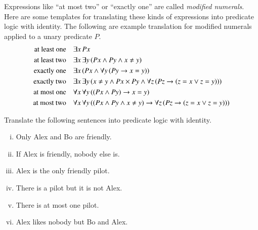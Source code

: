 \documentclass[nobib,nofonts]{tufte-handout}
\begin{document}
Expressions like ``at most two'' or ``exactly one'' are called \emph{modified numerals}.
Here are some templates for translating these kinds of expressions into predicate logic with identity.
The following are example translation for modified numerals applied to a unary predicate $P$.
\begin{align*}
  \text{at least one} &&& \exists x \thinspace Px \\
  \text{at least two} &&& \exists x \thinspace  \exists y \thinspace (Px \wedge Py \wedge x \neq y) \\
  \text{exactly one}  &&& \exists x \thinspace (Px \wedge \forall y \thinspace (Py \rightarrow x = y) )\\
  \text{exactly two}  &&& \exists x \thinspace \exists y \thinspace (x \neq y \wedge Px \times Py \wedge \forall z \thinspace (Pz \rightarrow (z = x \vee z = y))) \\
  \text{at most one}  &&& \forall x \thinspace \forall y \thinspace ((Px \wedge Py) \rightarrow x = y) \\
  \text{at most two}  &&& \forall x \thinspace \forall y \thinspace ((Px \wedge Py \wedge x \neq y) \rightarrow \forall z \thinspace (Pz \rightarrow (z =x \vee z = y)) )
\end{align*}


\bigskip
\noindent \colorbox{mygray}{\centering
  \begin{minipage}{1.0\textwidth}

    \begin{exercise}
      Translate the following sentences into predicate logic with identity.
      \begin{enumerate}[(i)]
        \item Only Alex and Bo are friendly.
        \item If Alex is friendly, nobody else is.
        \item Alex is the only friendly pilot.
        \item There is a pilot but it is not Alex.
        \item There is at most one pilot.
        \item Alex likes nobody but Bo and Alex.
      \end{enumerate}
    \end{exercise}

  \end{minipage}
}
\end{document}
